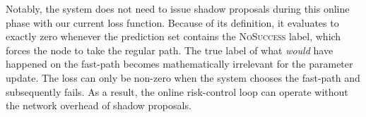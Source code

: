 Notably, the system does not need to issue shadow proposals during this online phase with our current loss function. Because of its definition, it evaluates to exactly zero whenever the prediction set contains the \textsc{NoSuccess} label, which forces the node to take the regular path. The true label of what \textit{would} have happened on the fast-path becomes mathematically irrelevant for the parameter update. The loss can only be non-zero when the system chooses the fast-path and subsequently fails. As a result, the online risk-control loop can operate without the network overhead of shadow proposals.